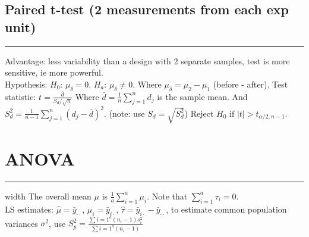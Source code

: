 \documentclass[10pt]{article}
\begin{document}
\subsection*{Paired t-test (2 measurements from each exp unit)}
\hrule width 11cm
\vspace{6pt}
Advantage: less variability than a design with 2 separate samples, test is more sensitive, ie more powerful. \\
Hypothesis: $H_0$: $\mu_{\delta} = 0$. $H_a$: $\mu_{\delta} \neq 0$. Where $\mu_{\delta} = \mu_2 - \mu_1$ (before - after).
Test statistic: $t = \frac{\bar{d}}{S_d / \sqrt{n}}$ Where $\bar{d} = \frac{1}{n}\sum_{j=1}^{n}d_j$ is the sample mean.
And $S_d^2 = \frac{1}{n-1} \sum_{j=1}^{n}(d_j - \bar{d})^2$. (note: use $S_d = \sqrt{S_d^2}$) Reject $H_0$ if $\left| t \right| > t_{\alpha/2, n-1}$.

\section*{ANOVA}
\hrule width \textwidth
\vspace{6pt}
The overall mean $\mu$ is $\frac{1}{a} \sum_{i=1}^{a} \mu_i$. Note that $\sum_{i=1}^{a}\tau_i = 0$. \\
LS estimates: $\hat{\mu} = \bar{y}_{\cdot \cdot}$, $\hat{\mu}_i = \bar{y}_{i \cdot}$, $\hat{\tau} = \bar{y}_{i \cdot} - \bar{y}_{\cdot \cdot}$, to estimate common population variances $\sigma^2$, use $S_p^2 = \frac{\sum{i=1}^{a}(n_i - 1)s_i^2}{\sum{i=1}^{a}(n_i -1)}$
\end{document}
